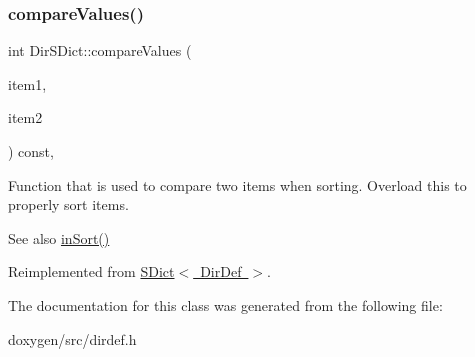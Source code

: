 \subsubsection{\texorpdfstring{compareValues()}{compareValues()}}
{\footnotesize\ttfamily int Dir\+S\+Dict\+::compare\+Values (\begin{DoxyParamCaption}\item[{const \mbox{\hyperlink{class_dir_def}{Dir\+Def}} $\ast$}]{item1,  }\item[{const \mbox{\hyperlink{class_dir_def}{Dir\+Def}} $\ast$}]{item2 }\end{DoxyParamCaption}) const\hspace{0.3cm}{\ttfamily [inline]}, {\ttfamily [virtual]}}

Function that is used to compare two items when sorting. Overload this to properly sort items. \begin{DoxySeeAlso}{See also}
\mbox{\hyperlink{class_s_dict_a25a85aeba441b4c855ea7be25a4741b5}{in\+Sort()}} 
\end{DoxySeeAlso}


Reimplemented from \mbox{\hyperlink{class_s_dict_a10086963aca06a9af9e0e6d75bf49763}{S\+Dict$<$ Dir\+Def $>$}}.



The documentation for this class was generated from the following file\+:\begin{DoxyCompactItemize}
\item 
doxygen/src/dirdef.\+h\end{DoxyCompactItemize}
